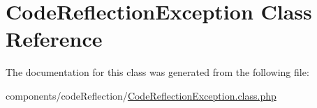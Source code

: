 \hypertarget{class_code_reflection_exception}{
\section{CodeReflectionException Class Reference}
\label{class_code_reflection_exception}
}


The documentation for this class was generated from the following file:\begin{CompactItemize}
\item 
components/codeReflection/\hyperlink{_code_reflection_exception_8class_8php}{CodeReflectionException.class.php}\end{CompactItemize}
